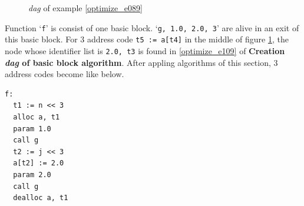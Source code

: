 \begin{Example}
\begin{figure}[htbp]
\begin{center}
\begin{latexonly}
\end{latexonly}
\caption{{\em dag} of example \ref{optimize_e089}}
\label{optimize_e090}
\end{center}
\end{figure}
Function `{\tt{f}}' is consist of one basic block.
`{\tt{g, 1.0, 2.0, 3}}' are
alive in an exit of this basic block.
For 3 address code {\tt{t5 := a[t4]}} in the middle of
figure \ref{optimize_e090},
the node whose identifier list is {\tt{2.0, t3}} is found 
in \ref{optimize_e109} of {\bf Creation {\em dag} of basic block
 algorithm}.
After appling algorithms of this section,
3 address codes become like below.
\begin{verbatim}
f:
  t1 := n << 3
  alloc a, t1
  param 1.0
  call g
  t2 := j << 3
  a[t2] := 2.0
  param 2.0
  call g
  dealloc a, t1
\end{verbatim}
\end{Example}


